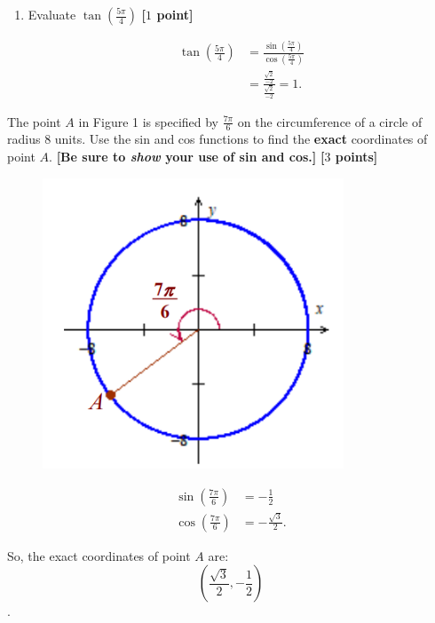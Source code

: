 \begin{problem}
\begin{enumerate}
      \item Evaluate $\tan \left(\frac{5\pi}{4}\right)$ \textbf{[$1$ point]}

        \begin{align*}
          \tan \left(\frac{5\pi}{4}\right) &= \frac{\sin \left(\frac{5\pi}{4}\right)}{\cos \left(\frac{5\pi}{4}\right)} \\
                                           &= \frac{\frac{\sqrt{2}}{-2}}{\frac{\sqrt{2}}{-2}} = 1
        .\end{align*}
    \end{enumerate}
\end{problem}

\newpage

\begin{problem}
  The point $A$ in Figure 1 is specified by $\frac{7\pi}{6}$ on the
  circumference of a circle of radius $8$ units. Use the sin and cos functions
  to find the \textbf{exact} coordinates of point $A$. \textbf{[Be sure to
  \textit{show} your use of sin and cos.]} \textbf{[$3$ points]}

  \begin{figure}[htpb]
    \centering
    \includegraphics[width=0.8\textwidth]{images/week-2.png}
    \caption{}
    \label{fig:}
  \end{figure}

  \begin{align*}
    \sin \left(\frac{7\pi}{6}\right) &= -\frac{1}{2} \\
    \cos \left(\frac{7\pi}{6}\right) &= -\frac{\sqrt{3}}{2}
  .\end{align*}

  So, the exact coordinates of point $A$ are:
  \[ \left(\frac{\sqrt{3}}{2}, -\frac{1}{2}\right) \].
\end{problem}

